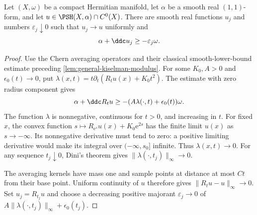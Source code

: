 \begin{lemma}\label{lem:continuous-potential-smooth-loss}
Let $(X,\omega)$ be a compact Hermitian manifold, let $\alpha$ be a smooth real $(1,1)$-form, and let $u\in\PSH(X,\alpha)\cap C^0(X)$. There are smooth real functions $u_j$ and numbers $\varepsilon_j\downarrow0$ such that $u_j\to u$ uniformly and
\[
 \alpha+\ddc u_j\geq-\varepsilon_j\omega.
\]
\end{lemma}
\begin{proof}
Use the Chern averaging operators and their classical smooth-lower-bound estimate preceding \cref{lem:general-kiselman-modulus}. For some $K_0,A>0$ and $\epsilon_0(t)\to0$, put $\lambda(x,t)=t\partial_t(R_tu(x)+K_0t^2)$. The estimate with zero radius component gives
\[
 \alpha+\ddc R_tu\geq-(A\lambda(\cdot,t)+\epsilon_0(t))\omega.
\]
The function $\lambda$ is nonnegative, continuous for $t>0$, and increasing in $t$. For fixed $x$, the convex function $s\mapsto R_{\mathrm{e}^s}u(x)+K_0\mathrm{e}^{2s}$ has the finite limit $u(x)$ as $s\to-\infty$. Its nonnegative derivative must tend to zero: a positive limiting derivative would make its integral over $(-\infty,s_0]$ infinite. Thus $\lambda(x,t)\to0$. For any sequence $t_j\downarrow0$, Dini's theorem gives $\|\lambda(\cdot,t_j)\|_\infty\to0$.

The averaging kernels have mass one and sample points at distance at most $Ct$ from their base point. Uniform continuity of $u$ therefore gives $\|R_tu-u\|_\infty\to0$. Set $u_j=R_{t_j}u$ and choose a decreasing positive majorant $\varepsilon_j\to0$ of $A\|\lambda(\cdot,t_j)\|_\infty+\epsilon_0(t_j)$.
\end{proof}


